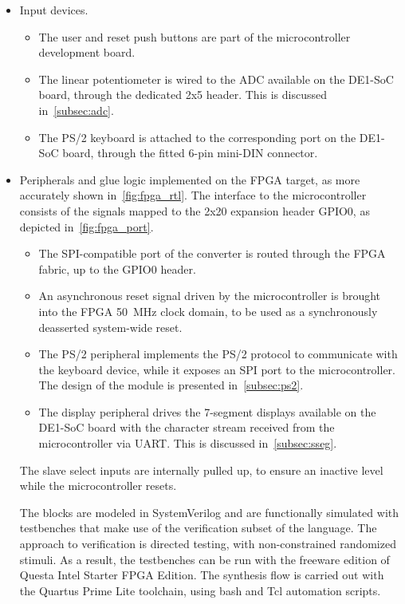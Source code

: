 \documentclass[]{article}
\begin{document}
\begin{itemize}
    \item Input devices.
    \begin{itemize}
        \item The user and reset push buttons are part of the microcontroller development board.
        \item The linear potentiometer is wired to the ADC available on the DE1-SoC board, through the dedicated 2x5 header. This is discussed in~\cref{subsec:adc}.
        \item The PS/2 keyboard is attached to the corresponding port on the DE1-SoC board, through the fitted 6-pin mini-DIN connector.
    \end{itemize}
    
    \item Peripherals and glue logic implemented on the FPGA target, as more accurately shown in~\cref{fig:fpga_rtl}.
    The interface to the microcontroller consists of the signals mapped to the 2x20 expansion header GPIO0, as depicted in~\cref{fig:fpga_port}.
    \begin{itemize}
        \item The SPI-compatible port of the converter is routed through the FPGA fabric, up to the GPIO0 header.
        \item An asynchronous reset signal driven by the microcontroller is brought into the FPGA \qty{50}{\MHz} clock domain, to be used as a synchronously deasserted system-wide reset.
        \item The PS/2 peripheral implements the PS/2 protocol to communicate with the keyboard device, while it exposes an SPI port to the microcontroller. The design of the module is presented in~\cref{subsec:ps2}.
        \item The display peripheral drives the 7-segment displays available on the DE1-SoC board with the character stream received from the microcontroller via UART. This is discussed in~\cref{subsec:sseg}.
    \end{itemize}
    The slave select inputs are internally pulled up, to ensure an inactive level while the microcontroller resets.

    The blocks are modeled in SystemVerilog and are functionally simulated with testbenches that make use of the verification subset of the language. The approach to verification is directed testing, with non-constrained randomized stimuli. As a result, the testbenches can be run with the freeware edition of Questa Intel Starter FPGA Edition.
    The synthesis flow is carried out with the Quartus Prime Lite toolchain, using bash and Tcl automation scripts.


\end{itemize}
\end{document}
